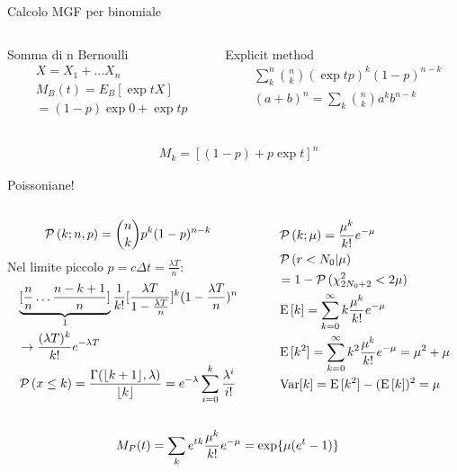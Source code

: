 \begin{wordonframe}{Calcolo MGF per binomiale}
\begin{columns}[T]
\begin{column}{0.5\textwidth}
\begin{block}{Somma di n Bernoulli}
\begin{align*}
&X=X_1+\ldots X_n\\
&M_B(t)=E_B[\exp{tX}]\\
&=(1-p)\exp{0}+\exp{t}p
\end{align*}
\end{block}
\end{column}
\begin{column}{0.5\textwidth}
\begin{block}{Explicit method}
\begin{align*}
&\sum_k^n\binom{n}{k}(\exp{t}p)^k(1-p)^{n-k}\\
&(a+b)^n=\sum_k\binom{n}{k}a^kb^{n-k}
\end{align*}
\end{block}
\end{column}
\end{columns}
\begin{align*}
&M_k=[(1-p)+p\exp{t}]^n
\end{align*}
\end{wordonframe}

\begin{frame}{Poissoniane!}
\begin{columns}[T]
	\begin{column}{0.5\textwidth}
\[\operatorname{\mathcal{P}}{(k;n,p)}=\binom{n}{k}p^k(1-p)^{n-k}\]
Nel limite piccolo $p=c\Delta t=\frac{\lambda T}{n}$:
\begin{align*}
&\underbrace{[\frac{n}{n}\ldots\frac{n-k+1}{n}]}_{1}\frac{1}{k!}[\frac{\lambda T}{1-\frac{\lambda T}{n}}]^k(1-\frac{\lambda T}{n})^n\\
&\to\frac{(\lambda T)^k}{k!}e^{-\lambda T}\\
&\operatorname{\mathcal{P}}{(x\leq k)}=\frac{\Gamma(\lfloor k+1\rfloor,\lambda)}{\lfloor k\rfloor}=e^{-\lambda}\sum_{i=0}^k\frac{\lambda^i}{i!}
\end{align*}
	\end{column}
	\begin{column}{0.5\textwidth}
		\begin{align*}
&\operatorname{\mathcal{P}}{(k;\mu)}=\frac{\mu^k}{k!}e^{-\mu}\\
&\operatorname{\mathcal{P}}{(r<N_0|\mu)}\\
&=1-\operatorname{\mathcal{P}}{(\chi^2_{2N_0+2}<2\mu)}\\
&\operatorname{E}{[k]}=\sum_{k=0}^{\infty}k\frac{\mu^k}{k!}e^{-\mu}\\
&\operatorname{E}{[k^2]}=\sum_{k=0}^{\infty}k^2\frac{\mu^k}{k!}e^{-\mu}=\mu^2+\mu\\
&\operatorname{Var}[k]=\operatorname{E}{[k^2]}-(\operatorname{E}{[k]})^2=\mu
\end{align*}
	\end{column}
\end{columns}
\begin{align*}
&M_P(t)=\sum_ke^{tk}\frac{\mu^k}{k!}e^{-\mu}=\text{exp}\{\mu(e^{t}-1)\}
\end{align*}
\end{frame}

